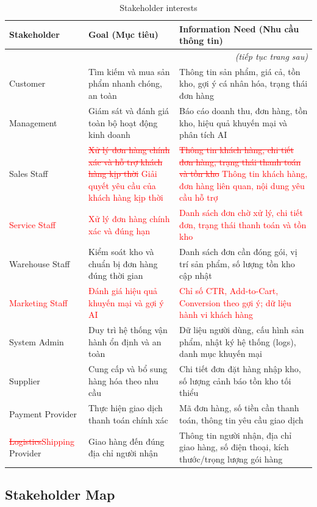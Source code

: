 \documentclass[12pt,a4paper,oneside]{report}
\newif\ifmark \marktrue
\newcommand{\chg}[1]{\ifmark\textcolor{red}{#1}\else #1\fi}
\newcommand{\del}[1]{\ifmark\textcolor{red}{\sout{#1}}\fi}
\begin{document}
\begin{longtable}{p{3.2cm}p{5cm}p{7.8cm}}
\caption{Stakeholder interests}\\
\toprule
\textbf{Stakeholder} & \textbf{Goal (Mục tiêu)} & \textbf{Information Need (Nhu cầu thông tin)} \\
\midrule
\endhead
\midrule
\multicolumn{3}{r}{\emph{(tiếp tục trang sau)}} \\
\endfoot
\bottomrule
\endlastfoot
Customer & Tìm kiếm và mua sản phẩm nhanh chóng, an toàn & Thông tin sản phẩm, giá cả, tồn kho, gợi ý cá nhân hóa, trạng thái đơn hàng \\
Management & Giám sát và đánh giá toàn bộ hoạt động kinh doanh & Báo cáo doanh thu, đơn hàng, tồn kho, hiệu quả khuyến mại và phân tích AI \\
Sales Staff & \del{Xử lý đơn hàng chính xác và hỗ trợ khách hàng kịp thời}\chg{ Giải quyết yêu cầu của khách hàng kịp thời} & \del{Thông tin khách hàng, chi tiết đơn hàng, trạng thái thanh toán và tồn kho}\chg{ Thông tin khách hàng, đơn hàng liên quan, nội dung yêu cầu hỗ trợ} \\
\chg{Service Staff} & \chg{Xử lý đơn hàng chính xác và đúng hạn} & \chg{Danh sách đơn chờ xử lý, chi tiết đơn, trạng thái thanh toán và tồn kho} \\
Warehouse Staff & Kiểm soát kho và chuẩn bị đơn hàng đúng thời gian & Danh sách đơn cần đóng gói, vị trí sản phẩm, số lượng tồn kho cập nhật \\
\chg{Marketing Staff} & \chg{Đánh giá hiệu quả khuyến mại và gợi ý AI} & \chg{Chỉ số CTR, Add-to-Cart, Conversion theo gợi ý; dữ liệu hành vi khách hàng} \\
System Admin & Duy trì hệ thống vận hành ổn định và an toàn & Dữ liệu người dùng, cấu hình sản phẩm, nhật ký hệ thống (logs), danh mục khuyến mại \\
Supplier & Cung cấp và bổ sung hàng hóa theo nhu cầu & Chi tiết đơn đặt hàng nhập kho, số lượng cảnh báo tồn kho tối thiểu \\
Payment Provider & Thực hiện giao dịch thanh toán chính xác & Mã đơn hàng, số tiền cần thanh toán, thông tin yêu cầu giao dịch \\
\del{Logistics}\chg{Shipping} Provider & Giao hàng đến đúng địa chỉ người nhận & Thông tin người nhận, địa chỉ giao hàng, số điện thoại, kích thước/trọng lượng gói hàng \\
\end{longtable}

\subsection{Stakeholder Map}
\end{document}
